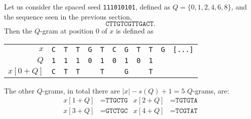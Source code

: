 \begin{example}
	Let us consider the spaced seed \texttt{111010101}, defined as $Q = \{ 0, 1, 2, 4, 6, 8 \}$, and the sequence seen in the previous section, \[ \texttt{CTTGTCGTTGACT}. \] Then the $Q$-gram at position $0$ of $x$ is defined as
	
	\begin{center}
		\begin{tabular}{r || ccccccccccc}
			$x$ & \texttt{C} & \texttt{T} & \texttt{T} & \texttt{G} & \texttt{T} & \texttt{C} & \texttt{G} & \texttt{T} & \texttt{T} & \texttt{G} & \texttt{[...]} \\
			$Q$ & \texttt{1} & \texttt{1} & \texttt{1} & \texttt{0} & \texttt{1} & \texttt{0} & \texttt{1} & \texttt{0} & \texttt{1} & & \\
			$x[0 + Q]$ & \texttt{C} & \texttt{T} & \texttt{T} & & \texttt{T} & & \texttt{G} & & \texttt{T} & & \\
		\end{tabular}
	\end{center}
	
	The other $Q$-grams, in total there are $|x| - s(Q) + 1 = 5$ $Q$-grams, are: \begin{align*}
		x[1 + Q] &= \texttt{TTGCTG} & x[2 + Q] &= \texttt{TGTGTA} \\
		x[3 + Q] &= \texttt{GTCTGC} & x[4 + Q] &= \texttt{TCGTAT}
	\end{align*}
\end{example}

%


